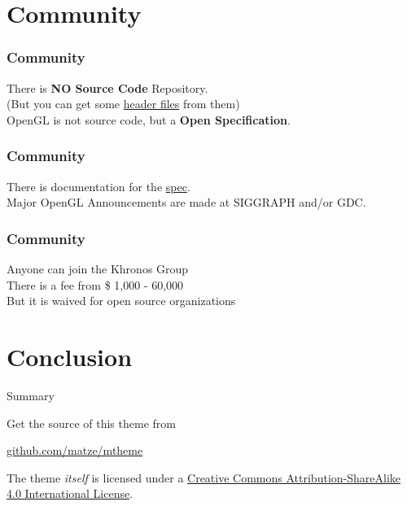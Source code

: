 \documentclass[10pt, compress]{beamer}
\begin{document}
\section{Community}

\begin{frame}[fragile]
    \frametitle{Community}
    
    There is \textbf{NO Source Code} Repository. \\
    (But you can get some \href{opengl.org/registry}{\alert{header files}} from them)
    \\ \vspace{5mm}
    OpenGL is not source code, but a \textbf{Open Specification}.
    
\end{frame}

\begin{frame}[fragile]
    \frametitle{Community}
    
    There is documentation for the \href{https://www.opengl.org/registry/doc/glspec45.core.pdf}{\alert{spec}}.
    \\ \vspace{5mm}
    Major OpenGL Announcements are made at SIGGRAPH and/or GDC.
    
\end{frame}

\begin{frame}[fragile]
    \frametitle{Community}
    
    Anyone can join the Khronos Group \\ \vspace{3mm}
    There is a fee from \$ 1,000 - 60,000 \\ \vspace{3mm}
    But it is waived for open source organizations
    
\end{frame}

\section{Conclusion}

\begin{frame}{Summary}

  Get the source of this theme from

  \begin{center}\url{github.com/matze/mtheme}\end{center}

  The theme \emph{itself} is licensed under a
  \href{http://creativecommons.org/licenses/by-sa/4.0/}{Creative Commons
  Attribution-ShareAlike 4.0 International License}.

  \begin{center}\ccbysa\end{center}

\end{frame}

\end{document}
